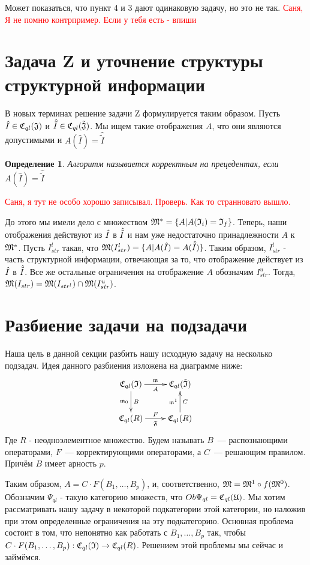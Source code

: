 \documentclass[a4paper, 12pt]{report}
\newtheorem{definition}{Определение}[chapter]
\begin{document}
Может показаться, что пункт 4 и 3 дают одинаковую задачу, но это не так. \textcolor{red}{Саня, Я не помню контрпример. Если у тебя есть - впиши}

\section{Задача Z и уточнение структуры структурной информации}
В новых терминах решение задачи Z формулируется таким образом. Пусть $\hat{I} \in \mathfrak{C}_{ql}(\mathfrak{J})$ и $\hat{\tilde{I}} \in \mathfrak{C}_{ql}(\tilde{\mathfrak{J}})$. Мы ищем такие отображения $A$, что они являются допустимыми и $A(\hat{I}) = \hat{\tilde{I}}$

\begin{definition}
Алгоритм называется корректным на прецедентах, если $A(\hat{I}) = \hat{\tilde{I}}$
\end{definition}
\textcolor{red}{Саня, я тут не особо хорошо записывал. Проверь. Как то странновато вышло.}

До этого мы имели дело с множеством $\mathfrak{M}^* = \{A| A(\mathfrak{I}_i) = \mathfrak{I}_f\}$. Теперь, наши отображения действуют из $\hat{I}$ в $\hat{\tilde{I}}$ и нам уже недостаточно принадлежности $A$ к $\mathfrak{M}^*$. Пусть $I_{str}^l$ такая, что $\mathfrak{M}(I_{str}^l) = \{A| A(\hat{I}) = A(\hat{\tilde{I}})\}$. Таким образом, $I_{str}^l$ - часть структурной информации, отвечающая за то, что отображение действует из $\hat{I}$ в $\hat{\tilde{I}}$. Все же остальные ограничения на отображение $A$ обозначим $I_{str}^u$. Тогда, $\mathfrak{M}(I_{str}) = \mathfrak{M}(I_{str^l})\cap\mathfrak{M}(I_{str}^u)$.

\section{Разбиение задачи на подзадачи}
Наша цель в данной секции разбить нашу исходную задачу на несколько подзадач. Идея данного разбиения изложена на диаграмме ниже:
\begin{equation*}
\xymatrix{
\Cql(\frakI)\ar[r]_A^\frakm\ar[d]_{\frakm_0}^B & \Cql(\tilde{\frakI})\\
\Cql(R)\ar[r]_{\mathfrak{F}}^F & \Cql(R)\ar[u]_C^{\frakm^1}
}
\end{equation*}
Где $R$ - неодноэлементное множество.
Будем называть $B$~--- распознающими операторами, $F$~--- корректирующими операторами, а $C$~--- решающим правилом. Причём $B$ имеет арность $p$.

Таким образом, $A = C\cdot F(B_1,\ldots, B_p)$, и, соответственно, $\mathfrak{M} = \mathfrak{M}^1\circ f(\mathfrak{M}^0)$.
Обозначим $\Psi_{ql}$ - такую категорию множеств, что $Ob\Psi_{ql} = \mathfrak{C}_{ql}(\mathfrak{U})$. Мы хотим рассматривать нашу задачу в некоторой подкатегории этой категории, но наложив при этом определенные ограничения на эту подкатегорию. Основная проблема состоит в том, что непонятно как работать с $B_1,\ldots, B_p$ так, чтобы $C\cdot F(B_1,\ldots, B_p): \mathfrak{C}_{ql}(\mathfrak{I})\rightarrow \mathfrak{C}_{ql}(R)$. Решением этой проблемы мы сейчас и займёмся.
\end{document}
